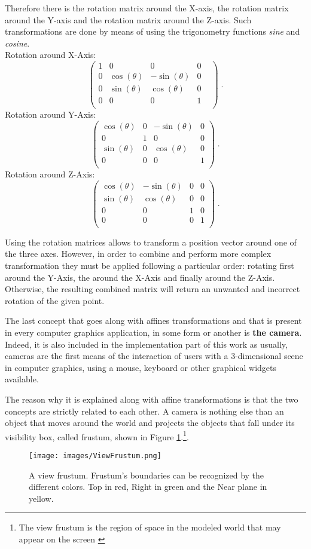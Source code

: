 \documentclass[12pt,a4paper]{extarticle}
\newcommand{\linespace}{\vspace{0pt}}
\begin{document}
Therefore there is the rotation matrix around the X-axis, the rotation matrix around the Y-axis and the rotation matrix around the Z-axis. Such transformations are done by means of using the trigonometry functions \textit{sine} and \textit{cosine}.\\
Rotation around X-Axis:
\[
\begin{pmatrix}
1&0&0&0&\\
0&\cos(\theta)& -\sin(\theta) & 0\\
0&\sin(\theta)&\cos(\theta)&0\\
0&0&0&1\\
\end{pmatrix}
\;.
\] 
Rotation around Y-Axis:
\[
\begin{pmatrix}
\cos(\theta) & 0 &-\sin(\theta)& 0\\
0&1&0&0\\
\sin(\theta)&0&\cos(\theta)&0\\
0&0&0&1\\
\end{pmatrix}
\;.
\]
Rotation around Z-Axis:
\[
\begin{pmatrix}
\cos(\theta)& -\sin(\theta) & 0 & 0\\
\sin(\theta)&\cos(\theta)&0&0\\
0&0&1&0\\
0&0&0&1\\
\end{pmatrix}
\;.
\]


Using the rotation matrices allows to transform a position vector around one of the three axes. However, in order to combine and perform more complex transformation they must be applied following a particular order: rotating first around the Y-Axis, the around the X-Axis and finally around the Z-Axis. Otherwise, the resulting combined matrix will return an unwanted and incorrect rotation of the given point.
\linespace

The last concept that goes along with affines transformations and that is present in every computer graphics application, in some form or another is \textbf{the camera}. Indeed, it is also included in the implementation part of this work as usually, cameras are the first means of the interaction of users with a 3-dimensional scene in computer graphics, using a mouse, keyboard or other graphical widgets available.
\linespace

The reason why it is explained along with affine transformations is that the two concepts are strictly related to each other. A camera is nothing else than an object that moves around the world and projects the objects that fall under its visibility box, called frustum, shown in Figure \ref{fig:viewfrustum}.\footnote{The view frustum is the region of space in the modeled world that may appear on the screen \cite{wiki_frustum:1}}.
\begin{figure}[hbtp]
\centering
\texttt{[image: images/ViewFrustum.png]}
\caption{A view frustum. Frustum's boundaries can be recognized by the different colors. Top in red, Right in green and the Near plane in yellow. }
\label{fig:viewfrustum}
\end{figure}
\end{document}
